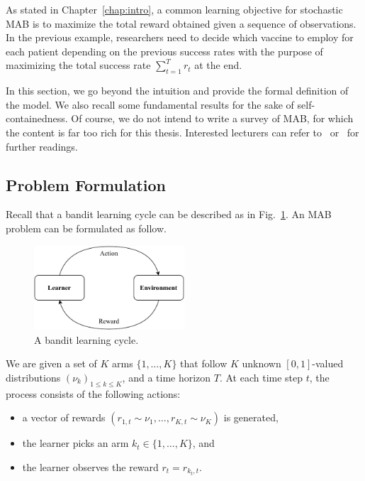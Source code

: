 As stated in Chapter~\ref{chap:intro}, a common learning objective for stochastic MAB is to maximize the total reward obtained given a sequence of observations. In the previous example, researchers need to decide which vaccine to employ for each patient depending on the previous success rates with the purpose of maximizing the total success rate $\sum_{t=1}^T r_t$ at the end.

In this section, we go beyond the intuition and provide the formal definition of the model. We also recall some fundamental results for the sake of self-containedness. Of course, we do not intend to write a survey of MAB, for which the content is far too rich for this thesis. Interested lecturers can refer to~\cite{bubeck2012bandits,lattimore2018bandits} or~\cite{slivkins2019bandits} for further readings.

\subsection{Problem Formulation}\label{sec:mab.model.formulation}

Recall that a bandit learning cycle can be described as in Fig.~\ref{fig:mab.mab}. An MAB problem can be formulated as follow.

\begin{figure}[ht]
    \centering
    \includegraphics[width=0.5\textwidth]{Chapter2/img/mab.pdf}
    \caption{A bandit learning cycle.}
    \label{fig:mab.mab}
\end{figure}

\begin{definition}\label{def:mab.mab}
\begin{leftbar}[defnbar]
	We are given a set of $K$ arms $\{1,\ldots,K\}$ that follow $K$ unknown $[0,1]$-valued distributions $(\nu_k)_{1 \leq k \leq K}$, and a time horizon $T$. At each time step $t$, the process consists of the following actions:
	\begin{itemize}
		\item a vector of rewards $(r_{1,t} \sim \nu_1, \ldots, r_{K,t} \sim \nu_K)$ is generated,
		\item the learner picks an arm $k_t \in \{1,\ldots,K\}$, and
		\item the learner observes the reward $r_t = r_{k_t, t}$.
	\end{itemize}
\end{leftbar}
\end{definition}

